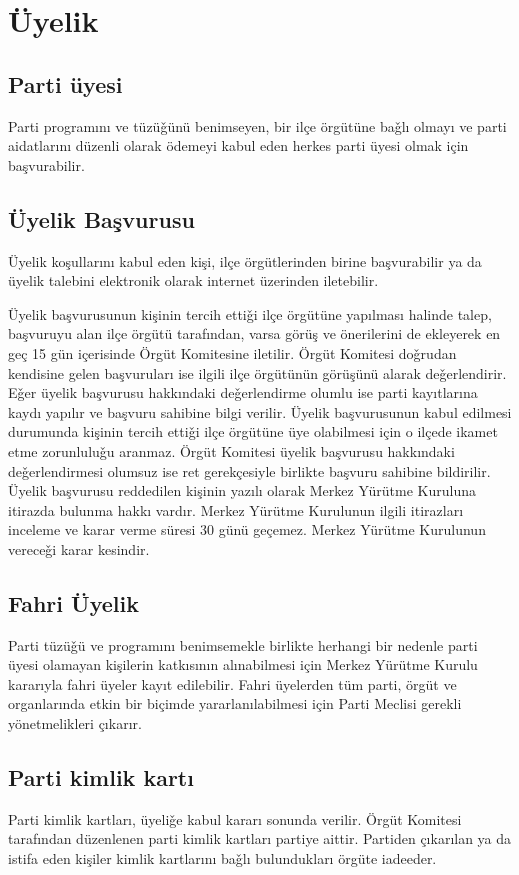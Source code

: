 \documentclass[11pt]{article} %
\begin{document}
\section{Üyelik}

\subsection{Parti üyesi}

Parti programını ve tüzüǧünü benimseyen, bir ilçe örgütüne baǧlı olmayı ve parti aidatlarını düzenli olarak ödemeyi kabul eden herkes parti üyesi olmak için başvurabilir.
\subsection{Üyelik Başvurusu}

Üyelik koşullarını kabul eden kişi, ilçe örgütlerinden birine başvurabilir ya da üyelik talebini elektronik olarak internet üzerinden iletebilir.

Üyelik başvurusunun kişinin tercih ettiǧi ilçe örgütüne yapılması halinde talep, başvuruyu alan ilçe örgütü tarafından, varsa görüş ve önerilerini de ekleyerek en geç 15 gün içerisinde Örgüt Komitesine iletilir. Örgüt Komitesi doǧrudan kendisine gelen başvuruları ise ilgili ilçe örgütünün görüşünü alarak deǧerlendirir.
Eǧer üyelik başvurusu hakkındaki deǧerlendirme olumlu ise parti kayıtlarına kaydı yapılır ve başvuru sahibine bilgi verilir. Üyelik başvurusunun kabul edilmesi durumunda kişinin tercih ettiǧi ilçe örgütüne üye olabilmesi için o ilçede ikamet etme zorunluluǧu aranmaz. Örgüt Komitesi üyelik başvurusu hakkındaki deǧerlendirmesi olumsuz ise ret gerekçesiyle birlikte başvuru sahibine bildirilir. Üyelik başvurusu reddedilen kişinin yazılı olarak Merkez Yürütme Kuruluna itirazda bulunma hakkı vardır. Merkez Yürütme Kurulunun ilgili itirazları inceleme ve karar verme süresi 30 günü geçemez. Merkez Yürütme Kurulunun vereceǧi karar kesindir.

\subsection{Fahri Üyelik}
Parti tüzüǧü ve programını benimsemekle birlikte herhangi bir nedenle parti üyesi olamayan kişilerin katkısının alınabilmesi için Merkez Yürütme Kurulu kararıyla fahri üyeler kayıt edilebilir. Fahri üyelerden tüm parti, örgüt ve organlarında etkin bir biçimde yararlanılabilmesi için Parti Meclisi gerekli yönetmelikleri çıkarır.
\subsection{Parti kimlik kartı}
Parti kimlik kartları, üyeliǧe kabul kararı sonunda verilir. Örgüt Komitesi tarafından düzenlenen parti kimlik kartları partiye aittir. Partiden çıkarılan ya da istifa eden kişiler kimlik kartlarını baǧlı bulundukları örgüte iadeeder.
\end{document}
